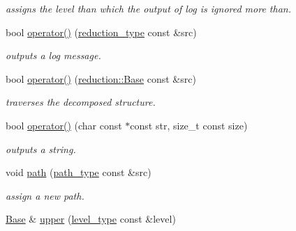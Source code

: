 \begin{DoxyCompactItemize}
\begin{DoxyCompactList}\small\item\em assigns the level than which the output of log is ignored more than. \end{DoxyCompactList}\item 
bool \hyperlink{classhryky_1_1log_1_1writer_1_1_base_a58d85035f2869f184b039b1c3760bb15}{operator()} (\hyperlink{namespacehryky_a343a9a4c36a586be5c2693156200eadc}{reduction\-\_\-type} const \&src)
\begin{DoxyCompactList}\small\item\em outputs a log message. \end{DoxyCompactList}\item 
\hypertarget{classhryky_1_1log_1_1writer_1_1_base_a5d2f205ab84e7dcf4ab4cca10389949b}{bool \hyperlink{classhryky_1_1log_1_1writer_1_1_base_a5d2f205ab84e7dcf4ab4cca10389949b}{operator()} (\hyperlink{classhryky_1_1reduction_1_1_base}{reduction\-::\-Base} const \&src)}\label{classhryky_1_1log_1_1writer_1_1_base_a5d2f205ab84e7dcf4ab4cca10389949b}

\begin{DoxyCompactList}\small\item\em traverses the decomposed structure. \end{DoxyCompactList}\item 
bool \hyperlink{classhryky_1_1log_1_1writer_1_1_base_af3dfcf1de847d720eb7dba2ca9476b4e}{operator()} (char const $\ast$const str, size\-\_\-t const size)
\begin{DoxyCompactList}\small\item\em outputs a string. \end{DoxyCompactList}\item 
\hypertarget{classhryky_1_1log_1_1writer_1_1_file_ad22e4f5ee9fe7ca7e653e7a8578b8e0f}{void \hyperlink{classhryky_1_1log_1_1writer_1_1_file_ad22e4f5ee9fe7ca7e653e7a8578b8e0f}{path} (\hyperlink{classhryky_1_1_string}{path\-\_\-type} const \&src)}\label{classhryky_1_1log_1_1writer_1_1_file_ad22e4f5ee9fe7ca7e653e7a8578b8e0f}

\begin{DoxyCompactList}\small\item\em assign a new path. \end{DoxyCompactList}\item 
\hypertarget{classhryky_1_1log_1_1writer_1_1_base_a802841d14501e525139b9b27c1e9c6f2}{\hyperlink{classhryky_1_1log_1_1writer_1_1_base}{Base} \& \hyperlink{classhryky_1_1log_1_1writer_1_1_base_a802841d14501e525139b9b27c1e9c6f2}{upper} (\hyperlink{classhryky_1_1log_1_1level_1_1_entity}{level\-\_\-type} const \&level)}\label{classhryky_1_1log_1_1writer_1_1_base_a802841d14501e525139b9b27c1e9c6f2}


\end{DoxyCompactItemize}
